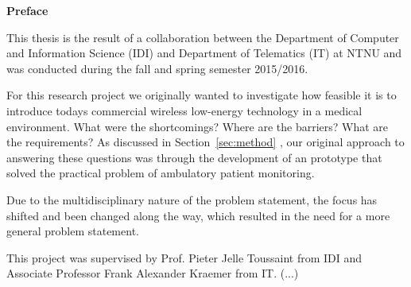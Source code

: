 \begin{0_preface}

	\noindent \textbf{Preface}
  \newline
  	
\noindent  
This thesis is the result of a collaboration between the Department of Computer and Information Science (IDI) and Department of Telematics (IT) at NTNU and was conducted during the fall and spring semester 2015/2016.

For this research project we originally wanted to investigate how feasible it is to introduce todays commercial wireless low-energy technology in a medical environment. What were the shortcomings? Where are the barriers? What are the requirements? As discussed in Section~\ref{sec:method} , our original approach to answering these questions was through the development of an prototype that solved the practical problem of ambulatory patient monitoring.

Due to the multidisciplinary nature of the problem statement, the focus has shifted and been changed along the way, which resulted in the need for a more general problem statement.

This project was supervised by Prof. Pieter Jelle Toussaint from IDI and Associate Professor Frank Alexander Kraemer from IT.
  (...)
  
\end{0_preface}